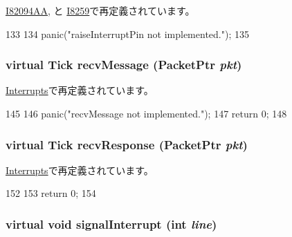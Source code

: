 \hyperlink{classX86ISA_1_1I82094AA_ac26dfa4264d910f3ef50015beafea211}{I82094AA}, と \hyperlink{classX86ISA_1_1I8259_ac26dfa4264d910f3ef50015beafea211}{I8259}で再定義されています。


\begin{DoxyCode}
133     {
134         panic("raiseInterruptPin not implemented.\n");
135     }
\end{DoxyCode}
\hypertarget{classX86ISA_1_1IntDevice_a6da97a03af9e80f6f8b865b85a430f35}{
\subsubsection[{recvMessage}]{\setlength{\rightskip}{0pt plus 5cm}virtual {\bf Tick} recvMessage ({\bf PacketPtr} {\em pkt})}}
\label{classX86ISA_1_1IntDevice_a6da97a03af9e80f6f8b865b85a430f35}


\hyperlink{classX86ISA_1_1Interrupts_a3dad3b561a1022eee5fab74df92ce766}{Interrupts}で再定義されています。


\begin{DoxyCode}
145     {
146         panic("recvMessage not implemented.\n");
147         return 0;
148     }
\end{DoxyCode}
\hypertarget{classX86ISA_1_1IntDevice_ae473b2a0c55e73359b9643810869ca81}{
\subsubsection[{recvResponse}]{\setlength{\rightskip}{0pt plus 5cm}virtual {\bf Tick} recvResponse ({\bf PacketPtr} {\em pkt})}}
\label{classX86ISA_1_1IntDevice_ae473b2a0c55e73359b9643810869ca81}


\hyperlink{classX86ISA_1_1Interrupts_a96d1a00beed669f9145d55bc3675d99c}{Interrupts}で再定義されています。


\begin{DoxyCode}
152     {
153         return 0;
154     }
\end{DoxyCode}
\hypertarget{classX86ISA_1_1IntDevice_a10c7e7cffe2e50c6c515fa1d8f0a4460}{
\subsubsection[{signalInterrupt}]{\setlength{\rightskip}{0pt plus 5cm}virtual void signalInterrupt (int {\em line})}}
\label{classX86ISA_1_1IntDevice_a10c7e7cffe2e50c6c515fa1d8f0a4460}


